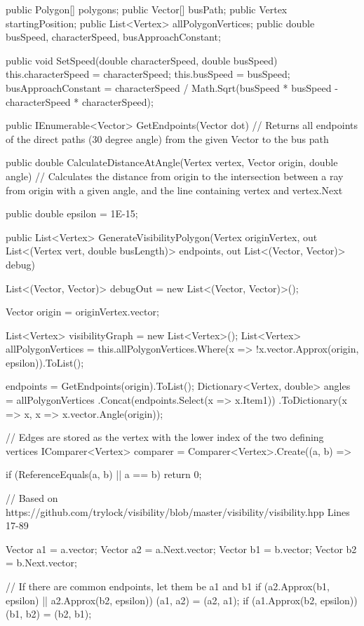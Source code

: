 \documentclass[12pt]{article}
\begin{document}
\begin{Csharp}[caption=class Map]
public Polygon[] polygons;
public Vector[] busPath;
public Vertex startingPosition;
public List<Vertex> allPolygonVertices;
public double busSpeed, characterSpeed, busApproachConstant;

public void SetSpeed(double characterSpeed, double busSpeed)
{
    this.characterSpeed = characterSpeed;
    this.busSpeed = busSpeed;
    busApproachConstant = characterSpeed / Math.Sqrt(busSpeed * busSpeed - characterSpeed * characterSpeed);
}

public IEnumerable<Vector> GetEndpoints(Vector dot)
// Returns all endpoints of the direct paths (30 degree angle) from the given Vector to the bus path

public double CalculateDistanceAtAngle(Vertex vertex, Vector origin, double angle)
// Calculates the distance from origin to the intersection between a ray from origin with a given angle, and the line containing vertex and vertex.Next

public double epsilon = 1E-15;

public List<Vertex> GenerateVisibilityPolygon(Vertex originVertex, out List<(Vertex vert, double busLength)> endpoints, out List<(Vector, Vector)> debug)
{
    List<(Vector, Vector)> debugOut = new List<(Vector, Vector)>();

    Vector origin = originVertex.vector;

    List<Vertex> visibilityGraph = new List<Vertex>();
    List<Vertex> allPolygonVertices = this.allPolygonVertices.Where(x => !x.vector.Approx(origin, epsilon)).ToList();

    endpoints = GetEndpoints(origin).ToList();
    Dictionary<Vertex, double> angles =
        allPolygonVertices
        .Concat(endpoints.Select(x => x.Item1))
        .ToDictionary(x => x, x => x.vector.Angle(origin));

    // Edges are stored as the vertex with the lower index of the two defining vertices
    IComparer<Vertex> comparer = Comparer<Vertex>.Create((a, b) =>
    {
        if (ReferenceEquals(a, b) || a == b) return 0;

        // Based on https://github.com/trylock/visibility/blob/master/visibility/visibility.hpp Lines 17-89

        Vector a1 = a.vector;
        Vector a2 = a.Next.vector;
        Vector b1 = b.vector;
        Vector b2 = b.Next.vector;

        // If there are common endpoints, let them be a1 and b1
        if (a2.Approx(b1, epsilon) || a2.Approx(b2, epsilon)) (a1, a2) = (a2, a1);
        if (a1.Approx(b2, epsilon)) (b1, b2) = (b2, b1);

}}
\end{Csharp}
\end{document}
